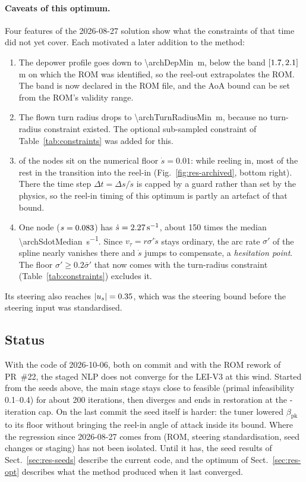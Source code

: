 \paragraph{Caveats of this optimum.}
Four features of the 2026-08-27 solution show what the constraints of that
time did not yet cover. Each motivated a later addition to the method:
\begin{enumerate}
  \item The depower profile goes down to \SI{\archDepMin}{m}, below the band
        $[1.7,2.1]$\,m on which the ROM was identified, so
        the reel-out extrapolates the ROM. The band is now declared in the
        ROM file, and the AoA bound can be set from the ROM's validity range.
  \item The flown turn radius drops to \SI{\archTurnRadiusMin}{m}, because
        no turn-radius constraint existed. The optional sub-sampled
        constraint of Table~\ref{tab:constraints} was added for this.
  \item \archFloorNodes{} of the \archNodes{} nodes sit on the numerical
        floor $\dot s=0.01$: \archFloorReelin{} while reeling in, most of
        the rest in the transition into the reel-in (Fig.~\ref{fig:res-archived},
        bottom right). There the time step $\Delta t=\Delta s/\dot s$ is
        capped by a guard rather than set by the physics, so the reel-in
        timing of this optimum is partly an artefact of that bound.
  \item One node ($s=0.083$) has $\dot s=\SI{2.27}{s^{-1}}$,
        about 150 times the median \SI{\archSdotMedian}{s^{-1}}. Since
        $v_\tau=r\sigma'\dot s$ stays ordinary, the arc rate $\sigma'$ of the
        spline nearly vanishes there and $\dot s$ jumps to compensate, a
        \emph{hesitation point}. The floor $\sigma'\ge0.2\bar\sigma'$ that now
        comes with the turn-radius constraint
        (Table~\ref{tab:constraints}) excludes it.
\end{enumerate}
Its steering also reaches $|u_s|=0.35$, which was the steering bound
before the steering input was standardised.

\subsection{Status}
\label{sec:res-status}

With the code of 2026-10-06, both on commit  and with the ROM
rework of PR~\#22, the staged NLP does not converge for the LEI-V3 at this
wind. Started from the seeds above, the main stage stays close to feasible
(primal infeasibility \num{0.1}--\num{0.4}) for about 200 iterations, then
diverges and ends in restoration at the \maxIter-iteration cap. On the last
commit the seed itself is harder: the tuner lowered $\beta_\mathrm{pk}$ to
its floor without bringing the reel-in angle of attack inside its bound. Where
the regression since 2026-08-27 comes from (ROM, steering standardisation,
seed changes or staging) has not been isolated. Until it has, the seed
results of Sect.~\ref{sec:res-seeds} describe the current code, and the
optimum of Sect.~\ref{sec:res-opt} describes what the method produced when
it last converged.
